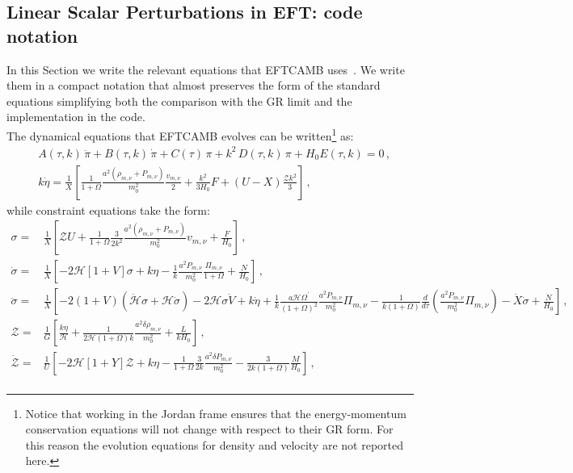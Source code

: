 \documentclass[prd,nofootinbib,showpacs]{revtex4}
\def\l{\left}
\def\r{\right}
\def\f{\frac}
\def\hub{{\mathcal H}}
\begin{document}
{\subsection{Linear Scalar Perturbations in EFT: code notation} \label{SubSec:EFTPe}
%
In this Section we write the relevant equations that EFTCAMB uses~\cite{Ma:1995ey}. We write them in a compact notation that almost preserves the form of the standard equations simplifying both the comparison with the GR limit and the implementation in the code. \\
The dynamical equations that EFTCAMB evolves can be written\footnote{Notice that working in the Jordan frame ensures that the energy-momentum conservation equations 
will not change with respect to their GR form. For this reason the evolution equations for density and velocity are not reported here.} as:
%
\begin{align}
& A(\tau,k)\,\ddot{\pi} + B(\tau,k)\,\dot{\pi} + C(\tau)\,\pi + k^2\,D(\tau,k)\,\pi + H_0 E(\tau,k) =0 \label{Eq:PiFieldEquation} \,,\\
& k\dot{\eta} = \f{1}{X}\l[\frac{1}{1+\Omega} \frac{a^2(\rho_{m,\nu}+P_{m,\nu})}{m_0^2}\frac{v_{m,\nu}}{2} + \frac{k^2}{3H_0}F +(U-X)\f{\mathcal{Z}k^2}{3}\r]   \label{Eq:EtaEquation}\,,
\end{align}
%
while constraint equations take the form:
%
\begin{align}
\sigma =&\f{1}{X}\l[ \mathcal{Z}U + \frac{1}{1+\Omega}\frac{3}{2k^2}\frac{a^2(\rho_{m,\nu}+P_{m,\nu})}{m_0^2}v_{m,\nu} + \frac{{F}}{H_0}\r] \label{Eq:SigmaEquation}\,,\\
%
\dot{\sigma} =&\f{1}{X}\l[ -2\mathcal{H}\l[1+V\r]\sigma  + k \eta-\frac{1}{k}\frac{a^2P_{m,\nu}}{m_0^2}\frac{\Pi_{m,\nu}}{1+\Omega} +\f{N}{H_0}\r] \label{Eq:SigmadotEquation}\,,\\
%
\ddot{\sigma} =& \f{1}{X}\l[ -2\l(1+V \r)\l(\dot{\mathcal{H}}\sigma +\hub \dot{\sigma} \r) -2\hub \sigma \dot{V} +k \dot{\eta} +\frac{1}{k}\frac{a \mathcal{H} \Omega^\prime}{(1+\Omega)^2}\frac{a^2P_{m,\nu}}{m_0^2}\Pi_{m,\nu} -\frac{1}{k(1+\Omega)}\frac{d}{d\tau}\left(\frac{a^2P_{m,\nu}}{m_0^2}\Pi_{m,\nu} \right)-\dot{{X}}\dot{\sigma} +\f{\dot{N}}{H_0}\r] \label{Eq:SigmadotdotEquation}\,,\\
%
\mathcal{Z} =& \f{1}{G}\l[\frac{k\eta}{\mathcal{H}} + \frac{1}{2\mathcal{H}(1+\Omega)k}\frac{a^2 \delta\rho_{m,\nu}}{m_0^2} + \frac{{L}}{kH_0} \r] \label{Eq:Zequation}\,,\\
%
\dot{\mathcal{Z}} =&\f{1}{U}\l[ -2 \mathcal{H} \l[1 + Y\r] \mathcal{Z} + k\eta -\frac{1}{1+\Omega}\frac{3}{2k}\frac{a^2\delta P_{m,\nu}}{m_0^2} - \frac{3}{2k(1+\Omega)}\frac{{M}}{H_0}\r] \,,\nonumber \\

\end{align}}
\end{document}
